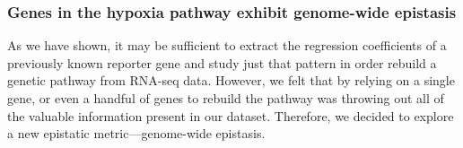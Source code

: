 \documentclass[9pt,twocolumn,twoside]{pnas-new}
\newcommand{\egl}{\emph{egl-9}}
\newcommand{\rhy}{\emph{rhy-1}}
\newcommand{\vhl}{\emph{vhl-1}}
\newcommand{\hif}{\emph{hif-1}}
\newcommand{\hifp}{HIF-1}
\begin{document}



\subsubsection*{Genes in the hypoxia pathway exhibit genome-wide epistasis}
As we have shown, it may be sufficient to extract the regression coefficients of a
previously known reporter gene and study just that pattern in order rebuild a
genetic pathway from RNA-seq data. However, we felt that by relying on a single
gene, or even a handful of genes to rebuild the pathway was throwing out all of
the valuable information present in our dataset. Therefore, we decided to
explore a new epistatic metric---genome-wide epistasis.
\end{document}
